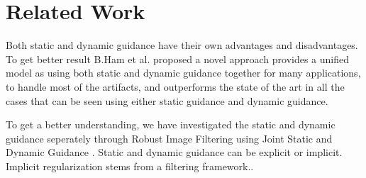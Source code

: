 \documentclass[10pt,twocolumn,letterpaper]{article}
\begin{document}
	\section{Related Work}
	
	Both static and dynamic guidance have their own advantages and disadvantages. To get better result B.Ham et al.\cite{ham2015robust} proposed a novel approach provides a unified model as using both static and dynamic guidance together for many applications, to handle most of the artifacts, and outperforms the state of the art in all the cases that can be seen using either static guidance and dynamic guidance.
	
	To get a better understanding, we have investigated the static and dynamic guidance seperately through Robust Image Filtering using Joint Static and Dynamic
	Guidance\cite{ham2015robust} . Static and dynamic guidance can be explicit or implicit. Implicit regularization stems from a filtering framework.\cite{ham2015robust}. 
	
\end{document}
